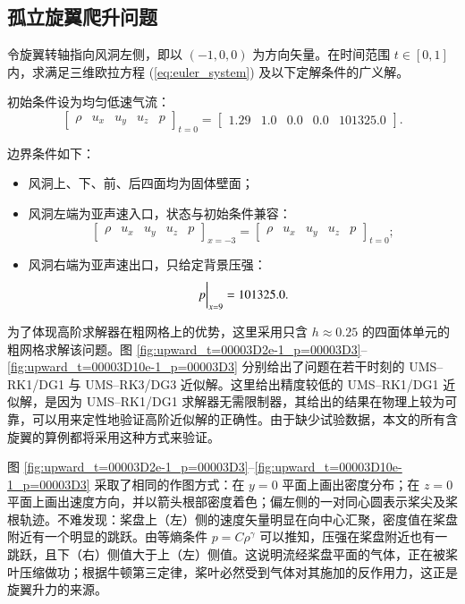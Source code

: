 \subsection{孤立旋翼爬升问题}
\begin{problem}
[孤立旋翼爬升]\label{prob:=005B64=007ACB=0065CB=007FFC=00722C=005347}令旋翼转轴指向风洞左侧，即以
$(-1,0,0)$ 为方向矢量。在时间范围 $t\in[0,1]$ 内，求满足三维欧拉方程 (\ref{eq:euler_system})
及以下定解条件的广义解。

初始条件设为均匀低速气流：
\begin{equation}
\begin{bmatrix}\rho & u_{x} & u_{y} & u_{z} & p\end{bmatrix}_{t=0}=\begin{bmatrix}1.29 & 1.0 & 0.0 & 0.0 & 101325.0\end{bmatrix}.
\end{equation}

边界条件如下：
\begin{itemize}
\item 风洞上、下、前、后四面均为固体壁面；
\item 风洞左端为亚声速入口，状态与初始条件兼容：
\begin{equation}
\begin{bmatrix}\rho & u_{x} & u_{y} & u_{z} & p\end{bmatrix}_{x=-3}=\begin{bmatrix}\rho & u_{x} & u_{y} & u_{z} & p\end{bmatrix}_{t=0};
\end{equation}
\item 风洞右端为亚声速出口，只给定背景压强：
\begin{equation}
\eval{p}_{x=9}=101325.0.
\end{equation}
\end{itemize}
\end{problem}

为了体现高阶求解器在粗网格上的优势，这里采用只含 $h\approx0.25$ 的四面体单元的粗网格求解该问题。图 \ref{fig:upward_t=00003D2e-1_p=00003D3}–\ref{fig:upward_t=00003D10e-1_p=00003D3}
分别给出了问题在若干时刻的
UMS–RK1/DG1 与 UMS–RK3/DG3 近似解。这里给出精度较低的 UMS–RK1/DG1 近似解，是因为 UMS–RK1/DG1
求解器无需限制器，其给出的结果在物理上较为可靠，可以用来定性地验证高阶近似解的正确性。由于缺少试验数据，本文的所有含旋翼的算例都将采用这种方式来验证。

图 \ref{fig:upward_t=00003D2e-1_p=00003D3}–\ref{fig:upward_t=00003D10e-1_p=00003D3}
采取了相同的作图方式：在 $y=0$ 平面上画出密度分布；在 $z=0$ 平面上画出速度方向，并以箭头根部密度着色；偏左侧的一对同心圆表示桨尖及桨根轨迹。不难发现：桨盘上（左）侧的速度矢量明显在向中心汇聚，密度值在桨盘附近有一个明显的跳跃。由等熵条件
$p=C\rho^{\gamma}$ 可以推知，压强在桨盘附近也有一跳跃，且下（右）侧值大于上（左）侧值。这说明流经桨盘平面的气体，正在被桨叶压缩做功；根据牛顿第三定律，桨叶必然受到气体对其施加的反作用力，这正是旋翼升力的来源。

